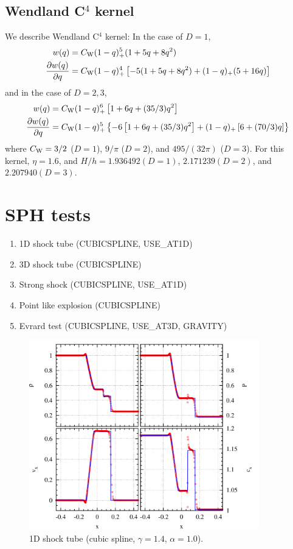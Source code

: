 \documentclass[fleqn,dvipdfmx]{article}
\begin{document}
\subsection{Wendland C$^4$ kernel}

We describe Wendland C$^4$ kernel: In the case of $D = 1$,
\begin{align}
  w(q) &= C_{\rm W} (1-q)_+^5 (1+5q+8q^2) \\
  \frac{\partial w(q)}{\partial q} &= C_{\rm W} (1-q)_+^4 \left[
    -5(1+5q+8q^2) + (1-q)_+ (5+16q) \right]
\end{align}
and in the case of $D = 2, 3$,
\begin{align}
  w(q) &= C_{\rm W} (1-q)_+^6 \left[ 1+6q+(35/3)q^2 \right] \\
  \frac{\partial w(q)}{\partial q} &= C_{\rm W} (1-q)_+^5 \left\{-6
  \left[ 1+6q+(35/3)q^2 \right] + (1-q)_+ \left[ 6+(70/3)q \right]
  \right\}
\end{align}
where $C_{\rm W}=3/2$ ($D=1$), $9/\pi$ ($D=2$), and $495/(32\pi)$
($D=3$). For this kernel, $\eta=1.6$, and $H/h=1.936492(D=1)$,
$2.171239(D=2)$, and $2.207940(D=3)$.

\section{SPH tests}

\begin{enumerate}
\item 1D shock tube (CUBICSPLINE, USE\_AT1D)
\item 3D shock tube (CUBICSPLINE)
\item Strong shock (CUBICSPLINE, USE\_AT1D)
\item Point like explosion (CUBICSPLINE)
\item Evrard test (CUBICSPLINE, USE\_AT3D, GRAVITY)
\end{enumerate}

\begin{figure}
  \begin{center}
    \includegraphics[width=10cm,bb=0 0 1020 840]{fig/shock_1d/draw.png}
  \end{center}
  \caption{1D shock tube (cubic spline, $\gamma=1.4$, $\alpha=1.0$).}
\end{figure}
\end{document}
